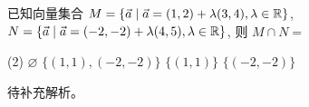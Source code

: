 \begin{choice}[source={2025深圳中学高三二轮三阶}, topic={向量集合的交集}]
已知向量集合 $M=\{\vec{a} \mid \vec{a}=(1,2)+\lambda(3,4), \lambda \in \mathbb{R}\}$, $N=\{\vec{a} \mid \vec{a}=(-2,-2)+\lambda(4,5), \lambda \in \mathbb{R}\}$, 则 $M \cap N=$
\begin{tasks}(2)
	\task $\varnothing$
	\task $\{(1,1),(-2,-2)\}$
	\task $\{(1,1)\}$
	\task $\{(-2,-2)\}$
\end{tasks}
\end{choice}
\begin{choice-sol}
待补充解析。
\end{choice-sol}
